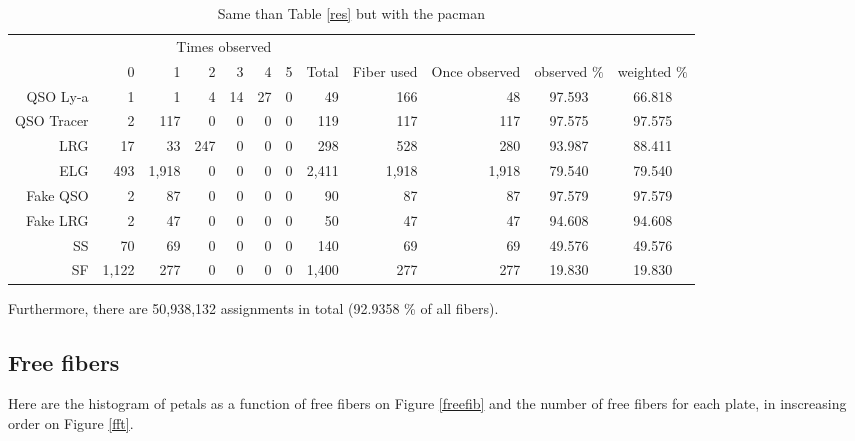 \documentclass{extarticle}
\begin{document}
\begin{table}[H]\begin{center}
\begin{tabular}{rrrrrrrrrrcc}
\hline
\multicolumn{6}{r}{Times observed} \\
	~ &           0 &     1 &  2 & 3 & 4 & 5 &  Total & Fiber used & Once observed & observed $\%$ & weighted $\%$ \\ \hline
   QSO Ly-a   &     1 &     1 &   4 & 14 & 27 & 0 &    49 &   166 &    48 & 97.593 & 66.818 \\ 
 QSO Tracer   &     2 &   117 &   0 &  0 &  0 & 0 &   119 &   117 &   117 & 97.575 & 97.575 \\ 
        LRG   &    17 &    33 & 247 &  0 &  0 & 0 &   298 &   528 &   280 & 93.987 & 88.411 \\ 
        ELG   &   493 & 1,918 &   0 &  0 &  0 & 0 & 2,411 & 1,918 & 1,918 & 79.540 & 79.540 \\ 
   Fake QSO   &     2 &    87 &   0 &  0 &  0 & 0 &    90 &    87 &    87 & 97.579 & 97.579 \\ 
   Fake LRG   &     2 &    47 &   0 &  0 &  0 & 0 &    50 &    47 &    47 & 94.608 & 94.608 \\ 
         SS   &    70 &    69 &   0 &  0 &  0 & 0 &   140 &    69 &    69 & 49.576 & 49.576 \\ 
         SF   & 1,122 &   277 &   0 &  0 &  0 & 0 & 1,400 &   277 &   277 & 19.830 & 19.830 \\ 
\hline
\end{tabular}
\caption{Same than Table \ref{res} but with the pacman}\label{pac}
\end{center}\end{table}

Furthermore, there are 50,938,132 assignments in total (92.9358 \% of all fibers).

\subsection{Free fibers}
Here are the histogram of petals as a function of free fibers on Figure \ref{freefib} and the number of free fibers for each plate, in inscreasing order on Figure \ref{fft}.
\end{document}
